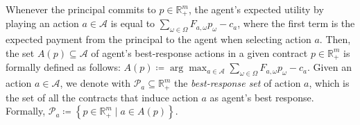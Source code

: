 %
Whenever the principal commits to $p \in \mathbb{R}^{m}_{+}$, the agent's expected utility by playing an action $a \in \mathcal{A}$ is equal to $\sum_{\omega \in \Omega}F_{a,\omega}p_{\omega} - c_a$, where the first term is the expected payment from the principal to the agent when selecting action $a$.
%
Then, the set $A(p) \subseteq \mathcal{A}$ of agent's best-response actions in a given contract $p \in \mathbb{R}^{m}_{+}$ is formally defined as follows:
    $A(p) \coloneqq  \arg\max_{a \in \mathcal{A}}  \sum_{\omega \in \Omega}F_{a,\omega}p_{\omega} - c_a .$
%
Given an action $a \in \mathcal{A}$, we denote with $\mathcal{P}_{a} \subseteq \mathbb{R}^{m}_{+}$ the \emph{best-response set} of action $a$, which is the set of all the contracts that induce action $a$ as agent's best response.
%
Formally, $\mathcal{P}_{a} \coloneqq \left \{ p \in \mathbb{R}^{m}_{+} \mid  a \in A(p) \right \}$.
%
%

